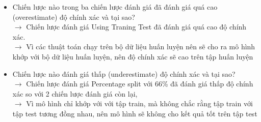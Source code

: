 \documentclass[a4paper, 12pt]{article}
\begin{document}
\begin{itemize}
    \item Chiến lược nào trong ba chiến lược đánh giá đã đánh giá quá cao (overestimate) độ chính xác và tại sao?\\
    $\rightarrow$ Chiến lược đánh giá Using Traning Test đã đánh giá quá cao độ chính xác. \\
    $\rightarrow$ Vì các thuật toán chạy trên bộ dữ liệu huấn luyện nên sẽ cho ra mô hình khớp với bộ dữ liệu huấn luyện, nên độ chính xác sẽ cao trên tập huấn luyện

    \item Chiến lược nào đánh giá thấp (underestimate) độ chính xác và tại sao?\\
    $\rightarrow$ Chiến lược đánh giá Percentage split với 66\% đã đánh giá thấp độ chính xác so với 2 chiến lược đánh giá còn lại, \\
    $\rightarrow$ Vì mô hình chỉ khớp với với tập train, mà không chắc rằng tập train với tập test tương đồng nhau, nên mô hình sẽ không cho kết quả tốt trên tập test
\end{itemize}
\clearpage
\end{document}
